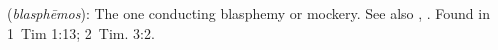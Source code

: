 \item[Blasphemous,]

(\textit{blasphēmos}):
The one conducting blasphemy or mockery. See also , .
Found in 1~Tim 1:13; 2~Tim. 3:2.
